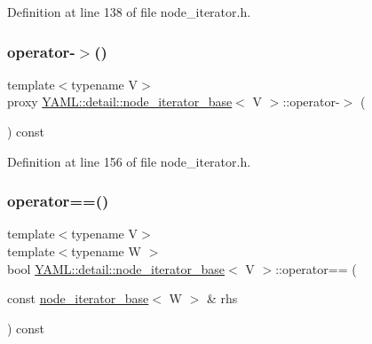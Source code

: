 Definition at line 138 of file node\+\_\+iterator.\+h.

\mbox{\label{class_y_a_m_l_1_1detail_1_1node__iterator__base_a54424b0334f6f91ffd03609516d90cc5}} 
\subsubsection{\texorpdfstring{operator-\/$>$()}{operator->()}}
{\footnotesize\ttfamily template$<$typename V$>$ \\
proxy \mbox{\hyperlink{class_y_a_m_l_1_1detail_1_1node__iterator__base}{Y\+A\+M\+L\+::detail\+::node\+\_\+iterator\+\_\+base}}$<$ V $>$\+::operator-\/$>$ (\begin{DoxyParamCaption}{ }\end{DoxyParamCaption}) const\hspace{0.3cm}{\ttfamily [inline]}}



Definition at line 156 of file node\+\_\+iterator.\+h.

\mbox{\label{class_y_a_m_l_1_1detail_1_1node__iterator__base_abbf381907a9b6dcebf45c31b78b9e3b1}} 
\subsubsection{\texorpdfstring{operator==()}{operator==()}}
{\footnotesize\ttfamily template$<$typename V$>$ \\
template$<$typename W $>$ \\
bool \mbox{\hyperlink{class_y_a_m_l_1_1detail_1_1node__iterator__base}{Y\+A\+M\+L\+::detail\+::node\+\_\+iterator\+\_\+base}}$<$ V $>$\+::operator== (\begin{DoxyParamCaption}\item[{const \mbox{\hyperlink{class_y_a_m_l_1_1detail_1_1node__iterator__base}{node\+\_\+iterator\+\_\+base}}$<$ W $>$ \&}]{rhs }\end{DoxyParamCaption}) const\hspace{0.3cm}{\ttfamily [inline]}}



